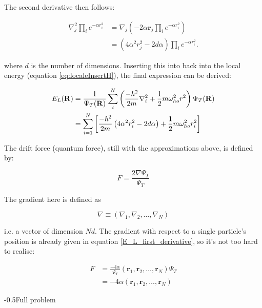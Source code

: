 \documentclass[english, a4paper]{article}
\makeatletter
\newcommand\lr[1]{\left(#1\right)}
\renewcommand{\subsubsection}{\@startsection{subsubsection}{3}{0pt}%
{-\baselineskip}{0.5\baselineskip}{\bf\large}}
\newcommand{\bm}[1]{\mathbf{#1}}
\makeatother
\begin{document}
The second derivative then follows:

\begin{align}
 \nabla_j^2 \prod_i e^{-\alpha r_i^2} 
 &= \nabla_j \lr{-2\alpha \bm{r}_j  \prod_i e^{-\alpha r_i^2}}\\
 &= \lr{4\alpha^2 r_j^2 - 2d\alpha}  \prod_i e^{-\alpha r_i^2}.	\label{simpleLaplacian}
\end{align}

where $d$ is the number of dimensions. Inserting this into back into the local energy (equation \eqref{eq:localeInsertH}), the final expression can be derived:

\begin{align}
\begin{split}
 E_L({\bf R}) &= \frac{1}{\Psi_T({\bf R})}\sum_i^N \lr{
	 \frac{-\hbar^2}{2m}
	 \nabla_{i}^2 +
	\frac{1}{2}m\omega_{ho}^2r^2}\Psi_T({\bf R})\\
    &= \sum_{i=1}^N\left[\frac{-\hbar^2}{2m}\lr{4\alpha^2 r_i^2 - 2d\alpha} + \frac{1}{2}m\omega_{ho}^2r_i^2\right] \label{SimpleLocalEnergies}
\end{split}
\end{align}



The drift force (quantum force), still with the approximations above, is defined by:

\begin{equation}
	F = \frac{2\nabla\Psi_T}{\Psi_T}
\end{equation}

The gradient here is defined as

\begin{equation*}
	\nabla \equiv \lr{\nabla_1,\nabla_2,\ldots,\nabla_N}
\end{equation*}

i.e. a vector of dimension $Nd$. The gradient with respect to a single particle's position is already given in equation \ref{E_L_first_derivative}, so it's not too hard to realise:

\begin{align*}
	F &= \frac{-4\alpha}{\Psi_T}\lr{\bm{r}_1,\bm{r}_2,\ldots,\bm{r}_N}\Psi_T\\
	&= -4\alpha\lr{\bm{r}_1,\bm{r}_2,\ldots,\bm{r}_N}
\end{align*}


\subsubsection{Full problem}
\end{document}
